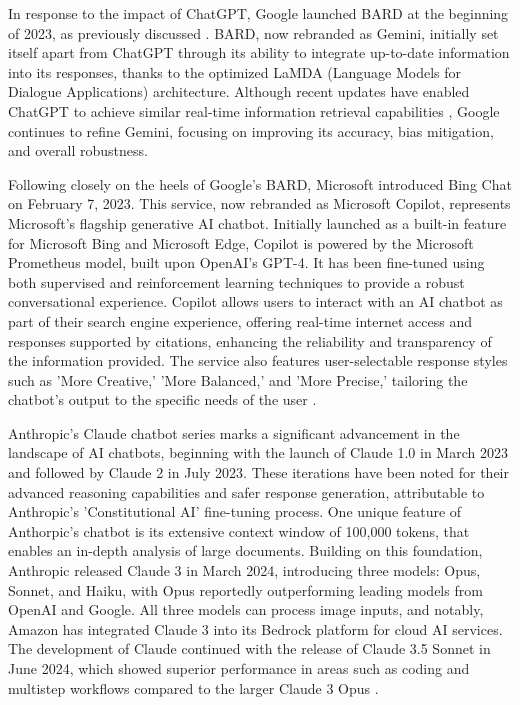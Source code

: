 In response to the impact of ChatGPT, Google launched BARD at the beginning of 2023, as previously discussed \cite{wikipedia2024gemini}. BARD, now rebranded as Gemini, initially set itself apart from ChatGPT through its ability to integrate up-to-date information into its responses, thanks to the optimized LaMDA (Language Models for Dialogue Applications) architecture. Although recent updates have enabled ChatGPT to achieve similar real-time information retrieval capabilities \cite{aljazeera2023chatgpt}, Google continues to refine Gemini, focusing on improving its accuracy, bias mitigation, and overall robustness.

Following closely on the heels of Google's BARD, Microsoft introduced Bing Chat on February 7, 2023. This service, now rebranded as Microsoft Copilot, represents Microsoft's flagship generative AI chatbot. Initially launched as a built-in feature for Microsoft Bing and Microsoft Edge, Copilot is powered by the Microsoft Prometheus model, built upon OpenAI's GPT-4. It has been fine-tuned using both supervised and reinforcement learning techniques to provide a robust conversational experience. Copilot allows users to interact with an AI chatbot as part of their search engine experience, offering real-time internet access and responses supported by citations, enhancing the reliability and transparency of the information provided. The service also features user-selectable response styles such as 'More Creative,' 'More Balanced,' and 'More Precise,' tailoring the chatbot's output to the specific needs of the user \cite{microsoft2024copilot, wikipedia2023copilot}.

Anthropic's Claude chatbot series marks a significant advancement in the landscape of AI chatbots, beginning with the launch of Claude 1.0 in March 2023 and followed by Claude 2 in July 2023. These iterations have been noted for their advanced reasoning capabilities and safer response generation, attributable to Anthropic's 'Constitutional AI' fine-tuning process. One unique feature of Anthorpic's chatbot is its extensive context window of 100,000 tokens, that enables an in-depth analysis of large documents. Building on this foundation, Anthropic released Claude 3 in March 2024, introducing three models: Opus, Sonnet, and Haiku, with Opus reportedly outperforming leading models from OpenAI and Google. All three models can process image inputs, and notably, Amazon has integrated Claude 3 into its Bedrock platform for cloud AI services. The development of Claude continued with the release of Claude 3.5 Sonnet in June 2024, which showed superior performance in areas such as coding and multistep workflows compared to the larger Claude 3 Opus \cite{wikipedia2024anthropic}.

